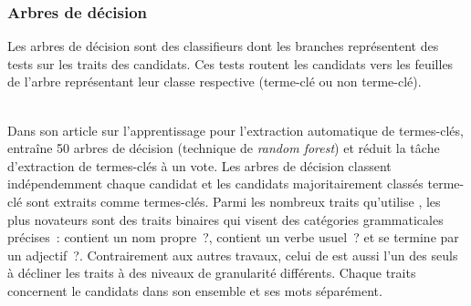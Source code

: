       \subsubsection{Arbres de décision}
      \label{subsubsec:main-state_of_the_art-automatic_keyphrase_extraction-supervised_keyphrase_extraction-decision_trees}
        Les arbres de décision sont des classifieurs dont les branches
        représentent des tests sur les
        traits des candidats. Ces tests routent les candidats
        vers les feuilles de l'arbre représentant leur classe respective
        (\og{}terme-clé\fg{} ou \og{}non terme-clé\fg{}).

        ~\\Dans son article sur l'apprentissage pour l'extraction automatique de
        termes-clés,  entraîne 50 arbres
        de décision (technique de \textit{random forest}) et réduit la tâche
        d'extraction de termes-clés à un vote. Les arbres de décision classent
        indépendemment chaque candidat et les candidats majoritairement
        classés \og{}terme-clé\fg{} sont extraits comme termes-clés. Parmi les
        nombreux traits qu'utilise , les
        plus novateurs sont des traits binaires qui visent des catégories
        grammaticales précises~: \og{}contient un nom propre~?\fg{},
        \og{}contient un verbe usuel~?\fg{} et \og{}se termine par un
        adjectif~?\fg{}. Contrairement aux autres travaux, celui de
         est aussi l'un des seuls à
        décliner les traits à des niveaux de granularité différents. Chaque
        traits concernent le candidats dans son ensemble et ses mots séparément.

